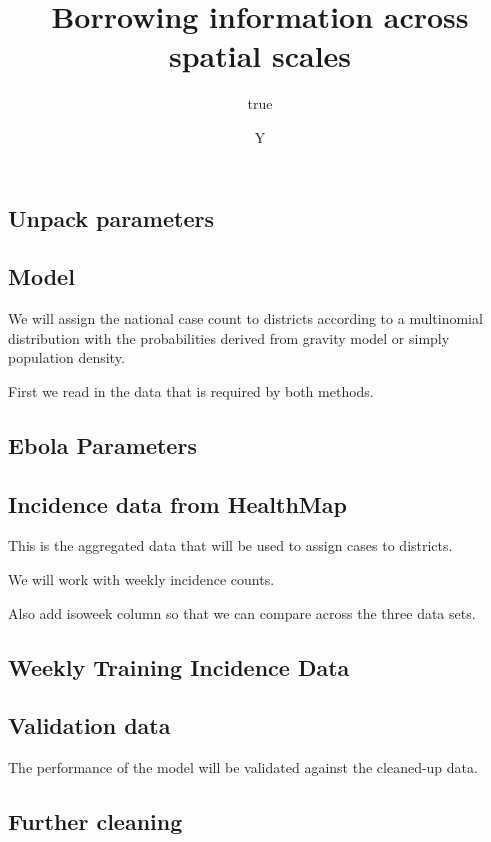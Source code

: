 \documentclass[11pt,]{article}
\title{Borrowing information across spatial scales}
\author{true}
\date{Y}
\begin{document}
\maketitle

\subsection{Unpack parameters}\label{unpack-parameters}

\subsection{Model}\label{model}

We will assign the national case count to districts according to a
multinomial distribution with the probabilities derived from gravity
model or simply population density.

First we read in the data that is required by both methods.

\subsection{Ebola Parameters}\label{ebola-parameters}

\subsection{Incidence data from
HealthMap}\label{incidence-data-from-healthmap}

This is the aggregated data that will be used to assign cases to
districts.

We will work with weekly incidence counts.

Also add isoweek column so that we can compare across the three data
sets.

\subsection{Weekly Training Incidence
Data}\label{weekly-training-incidence-data}

\subsection{Validation data}\label{validation-data}

The performance of the model will be validated against the cleaned-up
data.

\subsection{Further cleaning}\label{further-cleaning}
\end{document}
